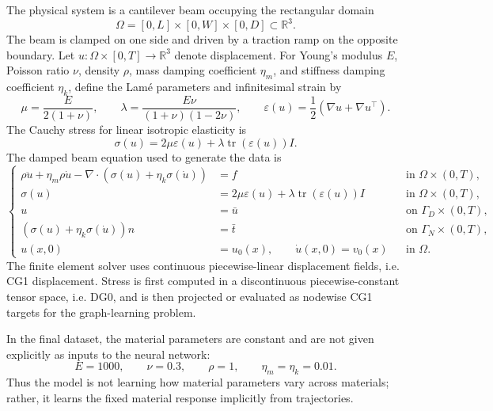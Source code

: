 \documentclass[11pt,a4paper,reqno]{amsart}
\theoremstyle{definition}
\theoremstyle{remark}
\numberwithin{equation}{section}
\newcommand{\R}{\mathbb{R}}
\newcommand{\grad}{\nabla}
\newcommand{\divg}{\nabla \cdot}
\newcommand{\tr}{\operatorname{tr}}
\begin{document}
The physical system is a cantilever beam occupying the rectangular domain
\begin{equation}
    \Omega = [0,L]\times [0,W]\times [0,D] \subset \R^3.
\end{equation}
The beam is clamped on one side and driven by a traction ramp on the opposite boundary. Let $u:\Omega\times[0,T]\to\R^3$ denote displacement. For Young's modulus $E$, Poisson ratio $\nu$, density $\rho$, mass damping coefficient $\eta_m$, and stiffness damping coefficient $\eta_k$, define the Lam\'e parameters and infinitesimal strain by
\begin{equation}
    \mu = \frac{E}{2(1+\nu)},
    \qquad
    \lambda = \frac{E\nu}{(1+\nu)(1-2\nu)},
    \qquad
    \varepsilon(u)=\frac{1}{2}\left(\grad u + \grad u^\top\right).
\end{equation}
The Cauchy stress for linear isotropic elasticity is
\begin{equation}
    \sigma(u)=2\mu\varepsilon(u)+\lambda\tr(\varepsilon(u))I.
\end{equation}
The damped beam equation used to generate the data is
\begin{equation}
\left\{
\begin{aligned}
    \rho \ddot u + \eta_m \rho \dot u - \divg\left(\sigma(u)+\eta_k\sigma(\dot u)\right) &= f && \text{in } \Omega\times(0,T),\\
    \sigma(u) &= 2\mu\varepsilon(u)+\lambda\tr(\varepsilon(u))I && \text{in } \Omega\times(0,T),\\
    u &= \bar u && \text{on } \Gamma_D\times(0,T),\\
    \left(\sigma(u)+\eta_k\sigma(\dot u)\right)n &= \bar t && \text{on } \Gamma_N\times(0,T),\\
    u(x,0)&=u_0(x),\qquad \dot u(x,0)=v_0(x) && \text{in } \Omega.
\end{aligned}
\right.
\label{eq:pde}
\end{equation}
The finite element solver uses continuous piecewise-linear displacement fields, i.e. CG1 displacement. Stress is first computed in a discontinuous piecewise-constant tensor space, i.e. DG0, and is then projected or evaluated as nodewise CG1 targets for the graph-learning problem.

In the final dataset, the material parameters are constant and are not given explicitly as inputs to the neural network:
\begin{equation}
    E=1000,\qquad \nu=0.3,
    \qquad \rho=1,
    \qquad \eta_m=\eta_k=0.01.
\end{equation}
Thus the model is not learning how material parameters vary across materials; rather, it learns the fixed material response implicitly from trajectories.
\end{document}
